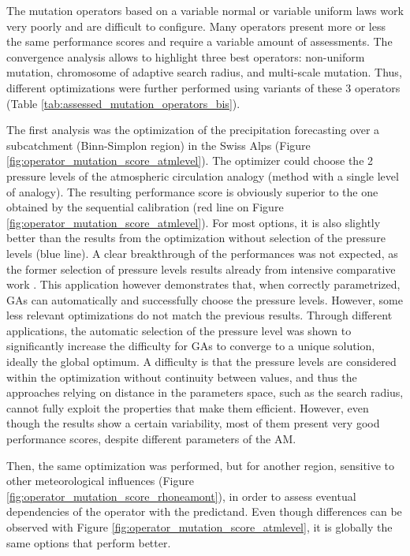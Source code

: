 \documentclass{ametsoc}
\begin{document}
The mutation operators based on a variable normal or variable uniform laws work very poorly and are difficult to configure. Many operators present more or less the same performance scores and require a variable amount of assessments. The convergence analysis \citep[see][]{Horton2012a} allows to highlight three best operators: non-uniform mutation, chromosome of adaptive search radius, and multi-scale mutation. Thus, different optimizations were further performed using variants of these 3 operators (Table \ref{tab:assessed_mutation_operators_bis}).

The first analysis was the optimization of the precipitation forecasting over a subcatchment (Binn-Simplon region) in the Swiss Alps (Figure \ref{fig:operator_mutation_score_atmlevel}). The optimizer could choose the 2 pressure levels of the atmospheric circulation analogy (method with a single level of analogy). The resulting performance score \citep[CRPSS = skill score of the CRPS, see][]{Brown1974} is obviously superior to the one obtained by the sequential calibration (red line on Figure \ref{fig:operator_mutation_score_atmlevel}). For most options, it is also slightly better than the results from the optimization without selection of the pressure levels (blue line). A clear breakthrough of the performances was not expected, as the former selection of pressure levels results already from intensive comparative work \citep{Bontron2004}. This application however demonstrates that, when correctly parametrized, GAs can automatically and successfully choose the pressure levels. However, some less relevant optimizations do not match the previous results. Through different applications, the automatic selection of the pressure level was shown to significantly increase the difficulty for GAs to converge to a unique solution, ideally the global optimum. A difficulty is that the pressure levels are considered within the optimization without continuity between values, and thus the approaches relying on distance in the parameters space, such as the search radius, cannot fully exploit the properties that make them efficient. However, even though the results show a certain variability, most of them present very good performance scores, despite different parameters of the AM.

Then, the same optimization was performed, but for another region, sensitive to other meteorological influences (Figure \ref{fig:operator_mutation_score_rhoneamont}), in order to assess eventual dependencies of the operator with the predictand. Even though differences can be observed with Figure \ref{fig:operator_mutation_score_atmlevel}, it is globally the same options that perform better.
\end{document}
